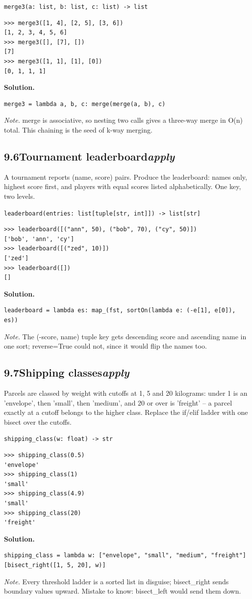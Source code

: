 \documentclass[10pt,letterpaper]{book}
\begin{document}
\noindent\texttt{merge3(a: list, b: list, c: list) -> list}
\begin{lstlisting}[style=ex]
>>> merge3([1, 4], [2, 5], [3, 6])
[1, 2, 3, 4, 5, 6]
>>> merge3([], [7], [])
[7]
>>> merge3([1, 1], [1], [0])
[0, 1, 1, 1]
\end{lstlisting}
\noindent\textbf{Solution.}
\begin{lstlisting}[style=code]
merge3 = lambda a, b, c: merge(merge(a, b), c)
\end{lstlisting}
\noindent\textit{Note.} merge is associative, so nesting two calls gives a three-way merge in O(n) total. This chaining is the seed of k-way merging.

\subsection*{9.6\quad Tournament leaderboard\hfill\textnormal{\textit{apply}}}
A tournament reports (name, score) pairs. Produce the leaderboard: names only, highest score first, and players with equal scores listed alphabetically. One key, two levels.

\noindent\texttt{leaderboard(entries: list[tuple[str, int]]) -> list[str]}
\begin{lstlisting}[style=ex]
>>> leaderboard([("ann", 50), ("bob", 70), ("cy", 50)])
['bob', 'ann', 'cy']
>>> leaderboard([("zed", 10)])
['zed']
>>> leaderboard([])
[]
\end{lstlisting}
\noindent\textbf{Solution.}
\begin{lstlisting}[style=code]
leaderboard = lambda es: map_(fst, sortOn(lambda e: (-e[1], e[0]), es))
\end{lstlisting}
\noindent\textit{Note.} The (-score, name) tuple key gets descending score and ascending name in one sort; reverse=True could not, since it would flip the names too.

\subsection*{9.7\quad Shipping classes\hfill\textnormal{\textit{apply}}}
Parcels are classed by weight with cutoffs at 1, 5 and 20 kilograms: under 1 is an 'envelope', then 'small', then 'medium', and 20 or over is 'freight' -- a parcel exactly at a cutoff belongs to the higher class. Replace the if/elif ladder with one bisect over the cutoffs.

\noindent\texttt{shipping\_class(w: float) -> str}
\begin{lstlisting}[style=ex]
>>> shipping_class(0.5)
'envelope'
>>> shipping_class(1)
'small'
>>> shipping_class(4.9)
'small'
>>> shipping_class(20)
'freight'
\end{lstlisting}
\noindent\textbf{Solution.}
\begin{lstlisting}[style=code]
shipping_class = lambda w: ["envelope", "small", "medium", "freight"][bisect_right([1, 5, 20], w)]
\end{lstlisting}
\noindent\textit{Note.} Every threshold ladder is a sorted list in disguise; bisect\_right sends boundary values upward. Mistake to know: bisect\_left would send them down.
\end{document}
